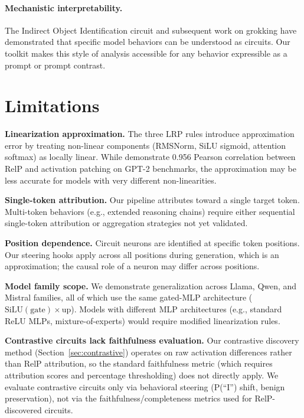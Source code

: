 \documentclass[11pt]{article}
\begin{document}
\paragraph{Mechanistic interpretability.}
The Indirect Object Identification circuit \citep{wang2023ioi} and subsequent work on grokking \citep{nanda2023progress} have demonstrated that specific model behaviors can be understood as circuits.
Our toolkit makes this style of analysis accessible for any behavior expressible as a prompt or prompt contrast.


\section{Limitations}
\label{sec:limitations}

\textbf{Linearization approximation.}
The three LRP rules introduce approximation error by treating non-linear components (RMSNorm, SiLU sigmoid, attention softmax) as locally linear.
While \citet{jafari2025relp} demonstrate 0.956 Pearson correlation between RelP and activation patching on GPT-2 benchmarks, the approximation may be less accurate for models with very different non-linearities.

\textbf{Single-token attribution.}
Our pipeline attributes toward a single target token.
Multi-token behaviors (e.g., extended reasoning chains) require either sequential single-token attribution or aggregation strategies not yet validated.

\textbf{Position dependence.}
Circuit neurons are identified at specific token positions.
Our steering hooks apply across all positions during generation, which is an approximation; the causal role of a neuron may differ across positions.

\textbf{Model family scope.}
We demonstrate generalization across Llama, Qwen, and Mistral families, all of which use the same gated-MLP architecture ($\text{SiLU}(\text{gate}) \times \text{up}$).
Models with different MLP architectures (e.g., standard ReLU MLPs, mixture-of-experts) would require modified linearization rules.

\textbf{Contrastive circuits lack faithfulness evaluation.}
Our contrastive discovery method (Section~\ref{sec:contrastive}) operates on raw activation differences rather than RelP attribution, so the standard faithfulness metric (which requires attribution scores and percentage thresholding) does not directly apply.
We evaluate contrastive circuits only via behavioral steering (P(``I'') shift, benign preservation), not via the faithfulness/completeness metrics used for RelP-discovered circuits.
\end{document}
